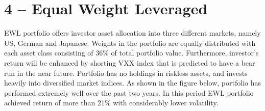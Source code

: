 \documentclass[11pt, parskip=full, DIV=14]{scrreprt}
\begin{document}
\newpage\section*{4 -- Equal Weight Leveraged}
EWL portfolio offers investor asset allocation into three different markets, namely US, German and Japanese. Weights in the portfolio are equally distributed with each asset class consisting of 36\% of total portfolio value. Furthermore, investor’s return will be enhanced by shorting VXX index that is predicted to have a bear run in the near future. Portfolio has no holdings in riskless assets, and invests heavily into diversified market indices. As shown in the figure below, portfolio has performed extremely well over the past two years. In this period EWL portfolio achieved return of more than 21\% with considerably lower volatility. 

\begin{figure}[H]
\end{figure}
\end{document}
